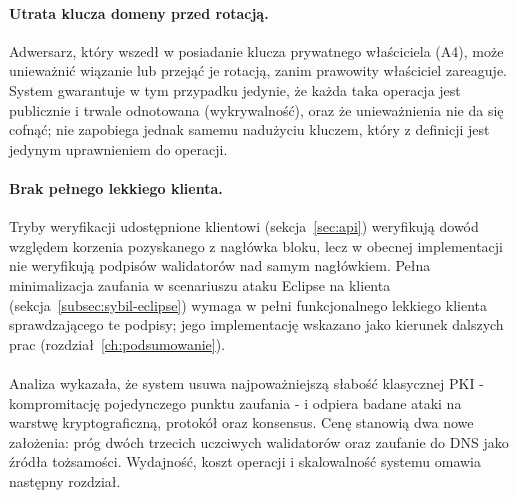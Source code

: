 \paragraph{Utrata klucza domeny przed rotacją.} Adwersarz, który wszedł w posiadanie klucza prywatnego właściciela (A4), może unieważnić wiązanie lub przejąć je rotacją, zanim prawowity właściciel zareaguje. System gwarantuje w tym przypadku jedynie, że każda taka operacja jest publicznie i trwale odnotowana (wykrywalność), oraz że unieważnienia nie da się cofnąć; nie zapobiega jednak samemu nadużyciu kluczem, który z definicji jest jedynym uprawnieniem do operacji.

\paragraph{Brak pełnego lekkiego klienta.} Tryby weryfikacji udostępnione klientowi (sekcja~\ref{sec:api}) weryfikują dowód względem korzenia pozyskanego z nagłówka bloku, lecz w obecnej implementacji nie weryfikują podpisów walidatorów nad samym nagłówkiem. Pełna minimalizacja zaufania w scenariuszu ataku Eclipse na klienta (sekcja~\ref{subsec:sybil-eclipse}) wymaga w pełni funkcjonalnego lekkiego klienta sprawdzającego te podpisy; jego implementację wskazano jako kierunek dalszych prac (rozdział~\ref{ch:podsumowanie}).

\paragraph{} Analiza wykazała, że system usuwa najpoważniejszą słabość klasycznej PKI - kompromitację pojedynczego punktu zaufania - i odpiera badane ataki na warstwę kryptograficzną, protokół oraz konsensus. Cenę stanowią dwa nowe założenia: próg dwóch trzecich uczciwych walidatorów oraz zaufanie do DNS jako źródła tożsamości. Wydajność, koszt operacji i skalowalność systemu omawia następny rozdział.
